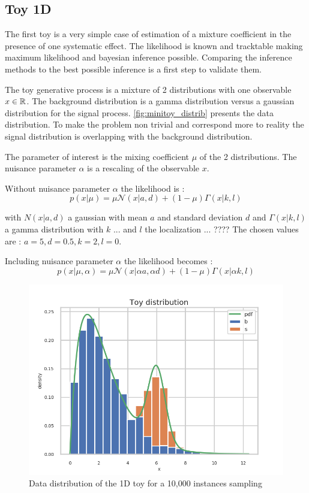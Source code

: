 \subsection{Toy 1D} %
\label{sub:toy_1d}



The first toy is a very simple case of estimation of a mixture coefficient in the presence of one systematic effect.
The likelihood is known and tracktable making maximum likelihood and bayesian inference possible.
Comparing the inference methods to the best possible inference is a first step to validate them.


The toy generative process is a mixture of 2 distributions with one observable $x \in \mathbb{R}$.
The background distribution is a gamma distribution versus a gaussian distribution for the signal process.
\autoref{fig:minitoy_distrib} presents the data distribution.
To make the problem non trivial and correspond more to reality the signal distribution is overlapping with the background distribution.

The parameter of interest is the mixing coefficient $\mu$ of the 2 distributions.
The nuisance parameter $\alpha$ is a rescaling of the observable $x$.

Without nuisance parameter $\alpha$ the likelihood is :
$$
    p(x | \mu) = \mu \mathcal N(x|a, d) + (1-\mu) \Gamma(x|k, l)
$$

with $N(x|a, d)$ a gaussian with mean $a$ and standard deviation $d$ and $\Gamma(x|k, l)$ a gamma distribution with $k$ ... and $l$ the localization  ... ????
The chosen values are : $a = 5, d=0.5, k=2, l=0$.


Including nuisance parameter $\alpha$ the likelihood becomes :
$$
    p(x | \mu, \alpha) = \mu \mathcal N(x|\alpha a, \alpha d) + (1-\mu) \Gamma(x|\alpha k, l)
$$

\begin{figure}[htb]
    \includegraphics[width=\linewidth]{minitoy/gg_distrib.png}
    \caption{Data distribution of the 1D toy for a 10,000 instances sampling}
    \label{fig:minitoy_distrib}
\end{figure}






